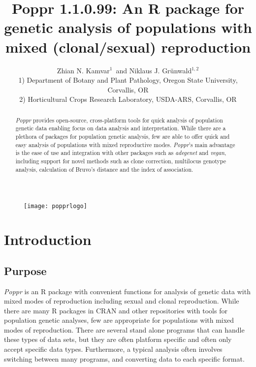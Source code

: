 \documentclass[letterpaper]{article}\usepackage[]{graphicx}\usepackage[]{color}
\title{Poppr 1.1.0.99: An R package for genetic analysis of populations with mixed (clonal/sexual) reproduction}
\author{Zhian N. Kamvar$^{1}$\ and Niklaus J. Gr\"unwald$^{1,2}$\\\scriptsize{1) Department of Botany and Plant Pathology, Oregon State University, Corvallis, OR}\\\scriptsize{2) Horticultural Crops Research Laboratory, USDA-ARS, Corvallis, OR}}
\newcommand{\tab}{\hspace*{1em}}
\newcommand{\Poppr}{\textit{Poppr}}
\newcommand{\adegenet}{\textit{adegenet}}
\begin{document}








\maketitle
\begin{abstract}
\Poppr{} provides open-source, cross-platform tools for quick analysis of population genetic data enabling focus on data analysis and interpretation. While there are a plethora of packages for population genetic analysis, few are able to offer quick and easy analysis of populations with mixed reproductive modes. \Poppr{}'s main advantage is the ease of use and integration with other packages such as \adegenet{} and \textit{vegan}, including support for novel methods such as clone correction, multilocus genotype analysis, calculation of Bruvo's distance and the index of association. 
\end{abstract}
\begin{figure}[b]
  \centering
  \label{logo}
  \texttt{[image: popprlogo]}
\end{figure}
\newpage
\begingroup
\hypersetup{linkcolor=black}
\tableofcontents
\endgroup

%
%
%
\section{Introduction}
\label{intro}
%
\subsection{Purpose}
\label{intro:purpose}

\tab\tab\Poppr{} is an R package with convenient functions for analysis of genetic data with mixed modes of reproduction including sexual and clonal reproduction. While there are many R packages in CRAN and other repositories with tools for population genetic analyses, few are appropriate for populations with mixed modes of reproduction. There are several stand alone programs that can handle these types of data sets, but they are often platform specific and often only accept specific data types. Furthermore, a typical analysis often involves switching between many programs, and converting data to each specific format.
\end{document}
